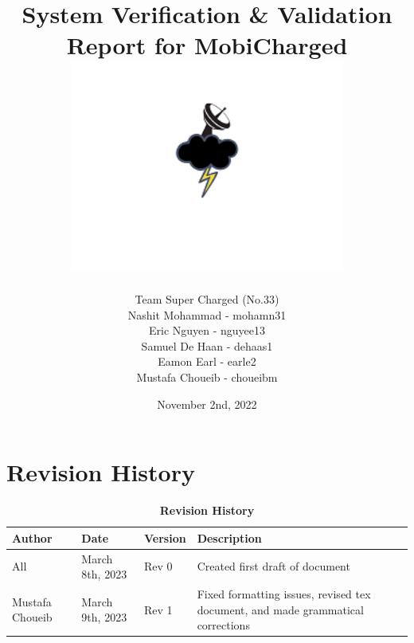 \documentclass[12pt, titlepage]{article}
\begin{document}
\title{
    System Verification \& Validation Report for MobiCharged\\
    \includegraphics[width=9cm]{images/mobicharged.png} 
}
\author{Team Super Charged (No.33)
		\\ Nashit Mohammad - mohamn31
		\\ Eric Nguyen - nguyee13
		\\ Samuel De Haan - dehaas1
		\\ Eamon Earl - earle2
		\\ Mustafa Choueib - choueibm
}
    

\date{November 2nd, 2022}


\maketitle

\tableofcontents
\listoffigures
\listoftables

\vspace{20pt}


\newpage


\section{Revision History}
\begin{center}
\begin{table}[H]
\caption{\bf Revision History}
    \begin{tabular}{p{2cm}p{3cm}p{2cm}p{6cm}}
    \hline
    \bf Author & \bf Date & \bf Version & \bf Description\\
    \hline
    All & March 8th, 2023 & Rev 0 & Created first draft of document\\
    \hline
    Mustafa Choueib & March 9th, 2023 & Rev 1 & Fixed formatting issues, revised tex document, and made grammatical corrections\\
    \hline
    \end{tabular}
\end{table}
\end{center}
\end{document}
